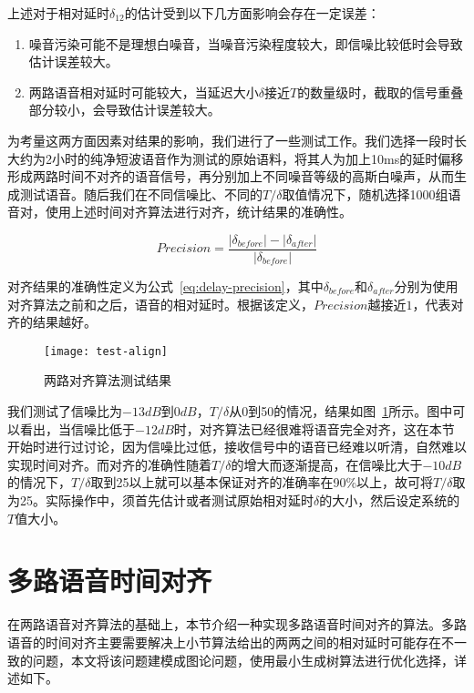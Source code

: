 上述对于相对延时$\delta_{12}$的估计受到以下几方面影响会存在一定误差：

\begin{enumerate}
\item 噪音污染可能不是理想白噪音，当噪音污染程度较大，即信噪比较低时会导致估计误差较大。
\item 两路语音相对延时可能较大，当延迟大小$\delta$接近$T$的数量级时，截取的信号重叠部分较小，会导致估计误差较大。
\end{enumerate}

为考量这两方面因素对结果的影响，我们进行了一些测试工作。我们选择一段时长大约为2小时的纯净短波语音作为测试的原始语料，将其人为加上10ms的延时偏移形成两路时间不对齐的语音信号，再分别加上不同噪音等级的高斯白噪声，从而生成测试语音。随后我们在不同信噪比、不同的$T/\delta$取值情况下，随机选择1000组语音对，使用上述时间对齐算法进行对齐，统计结果的准确性。

\begin{equation}\label{eq:delay-precision}
Precision=\frac{|\delta_{before}|-|\delta_{after}|}{|\delta_{before}|}
\end{equation}

对齐结果的准确性定义为公式~\ref{eq:delay-precision}，其中$\delta_{before}$和$\delta_{after}$分别为使用对齐算法之前和之后，语音的相对延时。根据该定义，$Precision$越接近$1$，代表对齐的结果越好。

\begin{figure}
\centering
\texttt{[image: test-align]}
\caption{两路对齐算法测试结果\label{fig:test-align}}
\end{figure}

我们测试了信噪比为$-13dB$到$0dB$，$T/\delta$从0到50的情况，结果如图~\ref{fig:test-align}所示。图中可以看出，当信噪比低于$-12dB$时，对齐算法已经很难将语音完全对齐，这在本节开始时进行过讨论，因为信噪比过低，接收信号中的语音已经难以听清，自然难以实现时间对齐。而对齐的准确性随着$T/\delta$的增大而逐渐提高，在信噪比大于$-10dB$的情况下，$T/\delta$取到25以上就可以基本保证对齐的准确率在90\%以上，故可将$T/\delta$取为25。实际操作中，须首先估计或者测试原始相对延时$\delta$的大小，然后设定系统的$T$值大小。


\section{多路语音时间对齐} \label{section:align-multi}

在两路语音对齐算法的基础上，本节介绍一种实现多路语音时间对齐的算法。多路语音的时间对齐主要需要解决上小节算法给出的两两之间的相对延时可能存在不一致的问题，本文将该问题建模成图论问题，使用最小生成树算法进行优化选择，详述如下。

